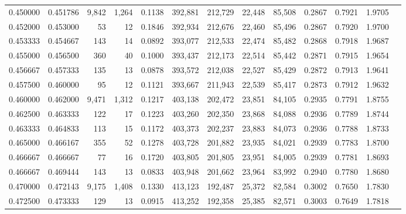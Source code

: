 \begin{tabular}{rrrrrrrrrrrrr}
0.450000 & 0.451786 &  9,842 & 1,264 &                                     0.1138 & 392,881 & 212,729 &  22,448 &  85,508 & 0.2867 & 0.7921 & 1.9705 \\
0.452000 & 0.453000 &     53 &    12 &                                     0.1846 & 392,934 & 212,676 &  22,460 &  85,496 & 0.2867 & 0.7920 & 1.9700 \\
0.453333 & 0.454667 &    143 &    14 &                                     0.0892 & 393,077 & 212,533 &  22,474 &  85,482 & 0.2868 & 0.7918 & 1.9687 \\
0.455000 & 0.456500 &    360 &    40 &                                     0.1000 & 393,437 & 212,173 &  22,514 &  85,442 & 0.2871 & 0.7915 & 1.9654 \\
0.456667 & 0.457333 &    135 &    13 &                                     0.0878 & 393,572 & 212,038 &  22,527 &  85,429 & 0.2872 & 0.7913 & 1.9641 \\
0.457500 & 0.460000 &     95 &    12 &                                     0.1121 & 393,667 & 211,943 &  22,539 &  85,417 & 0.2873 & 0.7912 & 1.9632 \\
0.460000 & 0.462000 &  9,471 & 1,312 &                                     0.1217 & 403,138 & 202,472 &  23,851 &  84,105 & 0.2935 & 0.7791 & 1.8755 \\
0.462500 & 0.463333 &    122 &    17 &                                     0.1223 & 403,260 & 202,350 &  23,868 &  84,088 & 0.2936 & 0.7789 & 1.8744 \\
0.463333 & 0.464833 &    113 &    15 &                                     0.1172 & 403,373 & 202,237 &  23,883 &  84,073 & 0.2936 & 0.7788 & 1.8733 \\
0.465000 & 0.466167 &    355 &    52 &                                     0.1278 & 403,728 & 201,882 &  23,935 &  84,021 & 0.2939 & 0.7783 & 1.8700 \\
0.466667 & 0.466667 &     77 &    16 &                                     0.1720 & 403,805 & 201,805 &  23,951 &  84,005 & 0.2939 & 0.7781 & 1.8693 \\
0.466667 & 0.469444 &    143 &    13 &                                     0.0833 & 403,948 & 201,662 &  23,964 &  83,992 & 0.2940 & 0.7780 & 1.8680 \\
0.470000 & 0.472143 &  9,175 & 1,408 &                                     0.1330 & 413,123 & 192,487 &  25,372 &  82,584 & 0.3002 & 0.7650 & 1.7830 \\
0.472500 & 0.473333 &    129 &    13 &                                     0.0915 & 413,252 & 192,358 &  25,385 &  82,571 & 0.3003 & 0.7649 & 1.7818 \\

\end{tabular}
